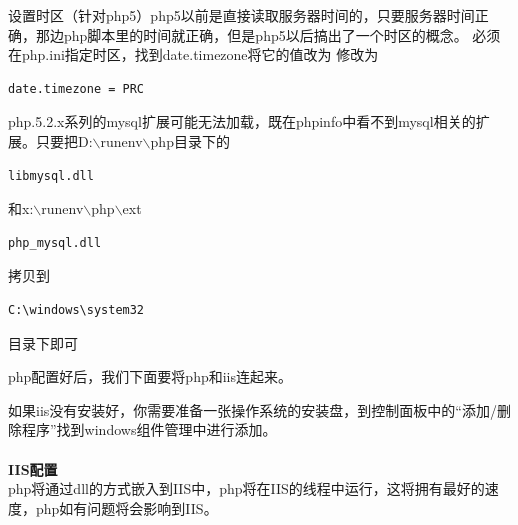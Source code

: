 \documentclass{article}
\begin{document}
\begin{enumerate}
设置时区（针对php5）php5以前是直接读取服务器时间的，只要服务器时间正确，那边php脚本里的时间就正确，但是php5以后搞出了一个时区的概念。
必须在php.ini指定时区，找到date.timezone将它的值改为 修改为
\begin{verbatim}
date.timezone = PRC
\end{verbatim}
php.5.2.x系列的mysql扩展可能无法加载，既在phpinfo中看不到mysql相关的扩展。只要把D:$\backslash$runenv$\backslash$php目录下的
\begin{verbatim}
libmysql.dll
\end{verbatim}
和x:$\backslash$runenv$\backslash$php$\backslash$ext
\begin{verbatim}
php_mysql.dll
\end{verbatim}
拷贝到 
\begin{verbatim}
C:\windows\system32
\end{verbatim}
目录下即可
\end{enumerate}

php配置好后，我们下面要将php和iis连起来。

如果iis没有安装好，你需要准备一张操作系统的安装盘，到控制面板中的“添加/删除程序”找到windows组件管理中进行添加。

\paragraph{}\textbf{IIS配置}\\

php将通过dll的方式嵌入到IIS中，php将在IIS的线程中运行，这将拥有最好的速度，php如有问题将会影响到IIS。
\end{document}

